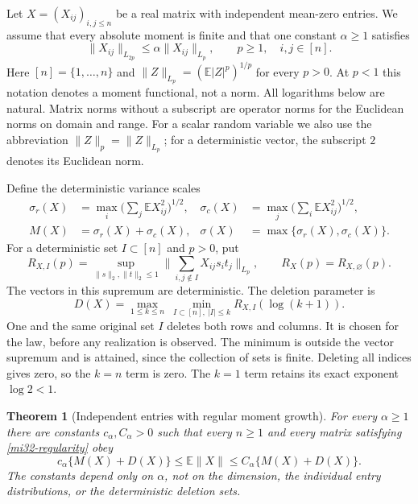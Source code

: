 \documentclass[11pt]{article}
\newtheorem{theorem}{Theorem}[section]
\theoremstyle{definition}
\theoremstyle{remark}
\newcommand{\E}{\mathbb E}
\newcommand{\norm}[1]{\lVert#1\rVert}
\begin{document}
Let $X=(X_{ij})_{i,j\le n}$ be a real matrix with independent mean-zero
entries. We assume that every absolute moment is finite and that one
constant $\alpha\ge1$ satisfies
\begin{equation}\label{mi32-regularity}
 \norm{X_{ij}}_{L_{2p}}\le\alpha\norm{X_{ij}}_{L_p},
 \qquad p\ge1,\quad i,j\in[n].
\end{equation}
Here $[n]=\{1,\ldots,n\}$ and
$\norm{Z}_{L_p}=(\E|Z|^p)^{1/p}$ for every $p>0$. At $p<1$ this
notation denotes a moment functional, not a norm. All logarithms below
are natural. Matrix norms without a subscript are operator norms for
the Euclidean norms on domain and range. For a scalar random variable
we also use the abbreviation $\norm{Z}_p=\norm{Z}_{L_p}$; for a
deterministic vector, the subscript $2$ denotes its Euclidean norm.

Define the deterministic variance scales
\begin{equation}\label{mi32-variances}
 \begin{aligned}
 \sigma_r(X)&=\max_i\Big(\sum_j\E X_{ij}^2\Big)^{1/2},&
 \sigma_c(X)&=\max_j\Big(\sum_i\E X_{ij}^2\Big)^{1/2},\\
 M(X)&=\sigma_r(X)+\sigma_c(X),&
 \sigma(X)&=\max\{\sigma_r(X),\sigma_c(X)\}.
 \end{aligned}
\end{equation}
For a deterministic set $I\subset[n]$ and $p>0$, put
\begin{equation}\label{mi32-weak}
 R_{X,I}(p)=\sup_{\norm{s}_2,\norm{t}_2\le1}
     \norm{\sum_{i,j\notin I}X_{ij}s_it_j}_{L_p},
 \qquad R_X(p)=R_{X,\varnothing}(p).
\end{equation}
The vectors in this supremum are deterministic. The deletion parameter is
\begin{equation}\label{mi32-D}
 D(X)=\max_{1\le k\le n}\ \min_{I\subset[n],\ |I|\le k}
                                  R_{X,I}(\log(k+1)).
\end{equation}
One and the same original set $I$ deletes both rows and columns. It is
chosen for the law, before any realization is observed. The minimum is
outside the vector supremum and is attained, since the collection of
sets is finite. Deleting all indices gives zero, so the $k=n$ term is
zero. The $k=1$ term retains its exact exponent $\log2<1$.

\begin{theorem}[Independent entries with regular moment growth]
\label{mi32-main-theorem}
For every $\alpha\ge1$ there are constants $c_\alpha,C_\alpha>0$
such that every $n\ge1$ and every matrix satisfying
\eqref{mi32-regularity} obey
\begin{equation}\label{mi32-main-bound}
 c_\alpha\{M(X)+D(X)\}\le\E\norm{X}
                       \le C_\alpha\{M(X)+D(X)\}.
\end{equation}
The constants depend only on $\alpha$, not on the dimension, the
individual entry distributions, or the deterministic deletion sets.
\end{theorem}
\end{document}
